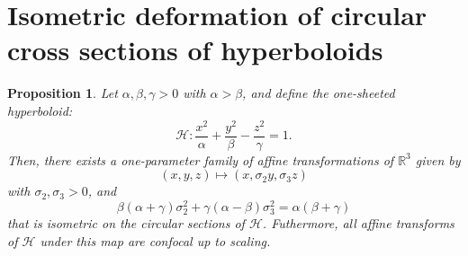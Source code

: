 \documentclass[10pt, a4paper]{article}
\theoremstyle{BoldTopSpacing}
\theoremstyle{BoldTopSpacing}
\theoremstyle{BoldTopSpacing}
\theoremstyle{BoldTopBottomSpacing}
\theoremstyle{BoldTopSpacing}
\newtheorem{proposition}{Proposition}[section]
\theoremstyle{BoldTopBottomSpacing}
\theoremstyle{remark}
\begin{document}
\section{Isometric deformation of circular cross sections of hyperboloids}
\label{sec:isometric-deformation}
\begin{proposition}
\label{prop:affine-transformation-one-sheeted}
Let $\alpha, \beta, \gamma > 0$ with $\alpha > \beta$, and define the one-sheeted hyperboloid:
\[
    \mathcal{H}: \frac{x^2}{\alpha} + \frac{y^2}{\beta} - \frac{z^2}{\gamma} = 1.
\]
Then, there exists a one-parameter family of affine transformations of $\mathbb{R}^3$ given by
\[
    (x, y, z) \mapsto (x, \sigma_{2}y, \sigma_{3}z)
\]
with $\sigma_{2}, \sigma_{3} > 0$, and
\begin{equation}
\label{eq:sigmas-h1}
    \beta(\alpha + \gamma) \sigma_{2}^2 + \gamma(\alpha - \beta) \sigma_{3}^2 = \alpha (\beta + \gamma)
\end{equation}
that is isometric on the circular sections of $\mathcal{H}$. Futhermore, all affine transforms of $\mathcal{H}$ under this map are confocal up to scaling.
\end{proposition}
\end{document}
